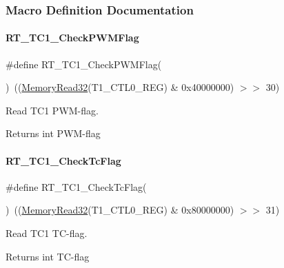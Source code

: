 \subsubsection{Macro Definition Documentation}
\mbox{\label{a00044_acf0b6d73b626b9f56f9f6fda79d0860c}} 
\paragraph{\texorpdfstring{R\+T\+\_\+\+T\+C1\+\_\+\+Check\+P\+W\+M\+Flag}{RT\_TC1\_CheckPWMFlag}}
{\footnotesize\ttfamily \#define R\+T\+\_\+\+T\+C1\+\_\+\+Check\+P\+W\+M\+Flag(\begin{DoxyParamCaption}{ }\end{DoxyParamCaption})~((\mbox{\hyperlink{a00020_a706b02571285f92589fbb0b964d7d0bb}{Memory\+Read32}}(T1\+\_\+\+C\+T\+L0\+\_\+\+R\+EG) \& 0x40000000) $>$$>$ 30)}



Read T\+C1 P\+W\+M-\/flag. 

\begin{DoxyReturn}{Returns}
int P\+W\+M-\/flag 
\end{DoxyReturn}
\mbox{\label{a00044_a3395d62010d1ca815676f3086f0dfb4a}} 
\paragraph{\texorpdfstring{R\+T\+\_\+\+T\+C1\+\_\+\+Check\+Tc\+Flag}{RT\_TC1\_CheckTcFlag}}
{\footnotesize\ttfamily \#define R\+T\+\_\+\+T\+C1\+\_\+\+Check\+Tc\+Flag(\begin{DoxyParamCaption}{ }\end{DoxyParamCaption})~((\mbox{\hyperlink{a00020_a706b02571285f92589fbb0b964d7d0bb}{Memory\+Read32}}(T1\+\_\+\+C\+T\+L0\+\_\+\+R\+EG) \& 0x80000000) $>$$>$ 31)}



Read T\+C1 T\+C-\/flag. 

\begin{DoxyReturn}{Returns}
int T\+C-\/flag 
\end{DoxyReturn}
\mbox{\label{a00044_a2a7757de241add69f5fffc4e1dfa431a}} 
